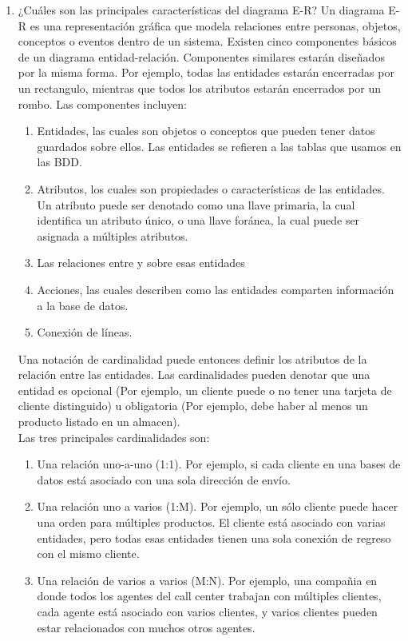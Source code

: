 \documentclass[11pt]{article}
\begin{document}
\begin{enumerate}
    \item ¿Cuáles son las principales características del diagrama E-R?
    Un diagrama E-R es una representación gráfica que modela relaciones entre personas, objetos, conceptos o eventos dentro de un sistema.
    Existen cinco componentes básicos de un diagrama entidad-relación.
    Componentes similares estarán diseñados por la misma forma. Por ejemplo, todas las entidades estarán encerradas por un rectangulo, mientras que todos los atributos estarán encerrados por un rombo. Las componentes incluyen:\\
    \begin{enumerate}
        \item Entidades, las cuales son objetos o conceptos que pueden tener datos guardados sobre ellos. Las entidades se refieren a las tablas que usamos en las BDD.
        \item Atributos, los cuales son propiedades o características de las entidades. Un atributo puede ser denotado como una llave primaria, la cual identifica un atributo único, o una llave foránea, la cual puede ser asignada a múltiples atributos.
        \item Las relaciones entre y sobre esas entidades
        \item Acciones, las cuales describen como las entidades comparten información a la base de datos.
        \item Conexión de líneas.
    \end{enumerate}
    Una notación de cardinalidad puede entonces definir los atributos de la relación entre las entidades. Las cardinalidades pueden denotar que una entidad es opcional (Por ejemplo, un cliente puede o no tener una tarjeta de cliente distinguido) u obligatoria (Por ejemplo, debe haber al menos un producto listado en un almacen).\\
    Las tres principales cardinalidades son:
    \begin{enumerate}
        \item Una relación uno-a-uno (1:1). Por ejemplo, si cada cliente en una bases de datos está asociado con una sola dirección de envío.
        \item Una relación uno a varios (1:M). Por ejemplo, un sólo cliente puede hacer una orden para múltiples productos. El cliente está asociado con varias entidades, pero todas esas entidades tienen una sola conexión de regreso con el mismo cliente.
        \item Una relación de varios a varios (M:N). Por ejemplo, una compañia en donde todos los agentes del call center trabajan con múltiples clientes, cada agente está asociado con varios clientes, y varios clientes pueden estar relacionados con muchos otros agentes.
    \end{enumerate}
    

\end{enumerate}
\end{document}
